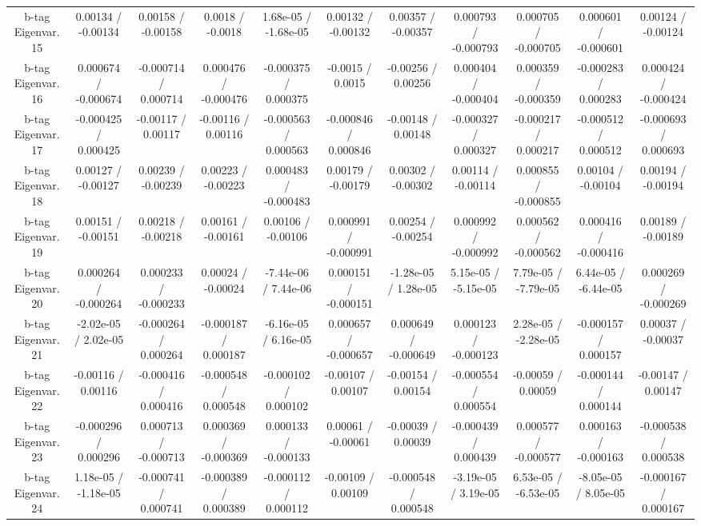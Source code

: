 {\begin{landscape}
\begin{longtable}{@{\extracolsep{\fill}}| *{11}{c|}}
  b-tag Eigenvar. 15 & 0.00134 / -0.00134 & 0.00158 / -0.00158 & 0.0018 / -0.0018 & 1.68e-05 / -1.68e-05 & 0.00132 / -0.00132 & 0.00357 / -0.00357 & 0.000793 / -0.000793 & 0.000705 / -0.000705 & 0.000601 / -0.000601 & 0.00124 / -0.00124 \\ 
  b-tag Eigenvar. 16 & 0.000674 / -0.000674 & -0.000714 / 0.000714 & 0.000476 / -0.000476 & -0.000375 / 0.000375 & -0.0015 / 0.0015 & -0.00256 / 0.00256 & 0.000404 / -0.000404 & 0.000359 / -0.000359 & -0.000283 / 0.000283 & 0.000424 / -0.000424 \\ 
  b-tag Eigenvar. 17 & -0.000425 / 0.000425 & -0.00117 / 0.00117 & -0.00116 / 0.00116 & -0.000563 / 0.000563 & -0.000846 / 0.000846 & -0.00148 / 0.00148 & -0.000327 / 0.000327 & -0.000217 / 0.000217 & -0.000512 / 0.000512 & -0.000693 / 0.000693 \\ 
  b-tag Eigenvar. 18 & 0.00127 / -0.00127 & 0.00239 / -0.00239 & 0.00223 / -0.00223 & 0.000483 / -0.000483 & 0.00179 / -0.00179 & 0.00302 / -0.00302 & 0.00114 / -0.00114 & 0.000855 / -0.000855 & 0.00104 / -0.00104 & 0.00194 / -0.00194 \\ 
  b-tag Eigenvar. 19 & 0.00151 / -0.00151 & 0.00218 / -0.00218 & 0.00161 / -0.00161 & 0.00106 / -0.00106 & 0.000991 / -0.000991 & 0.00254 / -0.00254 & 0.000992 / -0.000992 & 0.000562 / -0.000562 & 0.000416 / -0.000416 & 0.00189 / -0.00189 \\ 
  b-tag Eigenvar. 20 & 0.000264 / -0.000264 & 0.000233 / -0.000233 & 0.00024 / -0.00024 & -7.44e-06 / 7.44e-06 & 0.000151 / -0.000151 & -1.28e-05 / 1.28e-05 & 5.15e-05 / -5.15e-05 & 7.79e-05 / -7.79e-05 & 6.44e-05 / -6.44e-05 & 0.000269 / -0.000269 \\ 
  b-tag Eigenvar. 21 & -2.02e-05 / 2.02e-05 & -0.000264 / 0.000264 & -0.000187 / 0.000187 & -6.16e-05 / 6.16e-05 & 0.000657 / -0.000657 & 0.000649 / -0.000649 & 0.000123 / -0.000123 & 2.28e-05 / -2.28e-05 & -0.000157 / 0.000157 & 0.00037 / -0.00037 \\ 
  b-tag Eigenvar. 22 & -0.00116 / 0.00116 & -0.000416 / 0.000416 & -0.000548 / 0.000548 & -0.000102 / 0.000102 & -0.00107 / 0.00107 & -0.00154 / 0.00154 & -0.000554 / 0.000554 & -0.00059 / 0.00059 & -0.000144 / 0.000144 & -0.00147 / 0.00147 \\ 
  b-tag Eigenvar. 23 & -0.000296 / 0.000296 & 0.000713 / -0.000713 & 0.000369 / -0.000369 & 0.000133 / -0.000133 & 0.00061 / -0.00061 & -0.00039 / 0.00039 & -0.000439 / 0.000439 & 0.000577 / -0.000577 & 0.000163 / -0.000163 & -0.000538 / 0.000538 \\ 
  b-tag Eigenvar. 24 & 1.18e-05 / -1.18e-05 & -0.000741 / 0.000741 & -0.000389 / 0.000389 & -0.000112 / 0.000112 & -0.00109 / 0.00109 & -0.000548 / 0.000548 & -3.19e-05 / 3.19e-05 & 6.53e-05 / -6.53e-05 & -8.05e-05 / 8.05e-05 & -0.000167 / 0.000167 \\ 

\end{longtable}
\end{landscape}}
